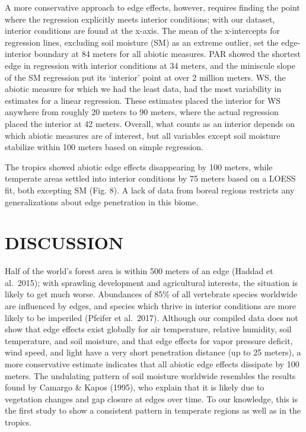 \documentclass[
  man]{apa6}
\begin{document}
A more conservative approach to edge effects, however, requires finding the point where the regression explicitly meets interior conditions; with our dataset, interior conditions are found at the x-axis. The mean of the x-intercepts for regression lines, excluding soil moisture (SM) as an extreme outlier, set the edge-interior boundary at 84 meters for all abiotic measures. PAR showed the shortest edge in regression with interior conditions at 34 meters, and the miniscule slope of the SM regression put its `interior' point at over 2 million meters. WS, the abiotic measure for which we had the least data, had the most variability in estimates for a linear regression. These estimates placed the interior for WS anywhere from roughly 20 meters to 90 meters, where the actual regression placed the interior at 42 meters. Overall, what counts as an interior depends on which abiotic measures are of interest, but all variables except soil moisture stabilize within 100 meters based on simple regression.

The tropics showed abiotic edge effects disappearing by 100 meters, while temperate areas settled into interior conditions by 75 meters based on a LOESS fit, both excepting SM (Fig. 8). A lack of data from boreal regions restricts any generalizations about edge penetration in this biome.

\section{DISCUSSION}\label{discussion}

Half of the world's forest area is within 500 meters of an edge (Haddad et al.~2015); with sprawling development and agricultural interests, the situation is likely to get much worse. Abundances of 85\% of all vertebrate species worldwide are influenced by edges, and species which thrive in interior conditions are more likely to be imperiled (Pfeifer et al.~2017). Although our compiled data does not show that edge effects exist globally for air temperature, relative humidity, soil temperature, and soil moisture, and that edge effects for vapor pressure deficit, wind speed, and light have a very short penetration distance (up to 25 meters), a more conservative estimate indicates that all abiotic edge effects dissipate by 100 meters. The undulating pattern of soil moisture worldwide resembles the results found by Camargo \& Kapos (1995), who explain that it is likely due to vegetation changes and gap closure at edges over time. To our knowledge, this is the first study to show a consistent pattern in temperate regions as well as in the tropics.
\end{document}
